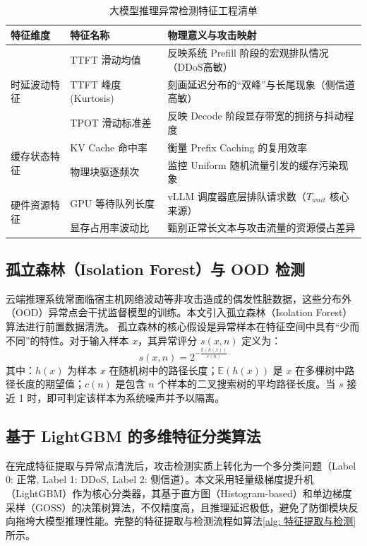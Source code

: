 \documentclass[master, vlined]{DissertUESTC}
\begin{document}
	\begin{table}[!ht]
		\caption{大模型推理异常检测特征工程清单} \label{tab: 大模型推理异常检测特征工程清单}
		\begin{tabular}{p{2.5cm} p{3.5cm} p{8cm}}
			\toprule
			\textbf{特征维度} & \textbf{特征名称} & \textbf{物理意义与攻击映射} \\
			\midrule
			\multirow{3}{*}{时延波动特征} & TTFT 滑动均值 & 反映系统 Prefill 阶段的宏观排队情况（DDoS高敏） \\
			& TTFT 峰度 (Kurtosis) & 刻画延迟分布的“双峰”与长尾现象（侧信道高敏） \\
			& TPOT 滑动标准差 & 反映 Decode 阶段显存带宽的拥挤与抖动程度 \\
			\midrule
			\multirow{2}{*}{缓存状态特征} & KV Cache 命中率 & 衡量 Prefix Caching 的复用效率 \\
			& 物理块驱逐频次 & 监控 Uniform 随机流量引发的缓存污染现象 \\
			\midrule
			\multirow{2}{*}{硬件资源特征} & GPU 等待队列长度 & vLLM 调度器底层排队请求数（$T_{wait}$ 核心来源） \\
			& 显存占用率波动比 & 甄别正常长文本与攻击流量的资源侵占差异 \\
			\bottomrule
		\end{tabular}
	\end{table}

	\subsection{孤立森林（Isolation Forest）与 OOD 检测}
	云端推理系统常面临宿主机网络波动等非攻击造成的偶发性脏数据，这些分布外（OOD）异常点会干扰监督模型的训练。本文引入孤立森林（Isolation Forest）算法进行前置数据清洗。
	孤立森林的核心假设是异常样本在特征空间中具有“少而不同”的特性。对于输入样本 $x$，其异常评分 $s(x, n)$ 定义为：
	\begin{equation}
		s(x, n) = 2^{-\frac{\mathbb{E}(h(x))}{c(n)}}
	\end{equation}
	其中：$h(x)$ 为样本 $x$ 在随机树中的路径长度；$\mathbb{E}(h(x))$ 是 $x$ 在多棵树中路径长度的期望值；$c(n)$ 是包含 $n$ 个样本的二叉搜索树的平均路径长度。当 $s$ 接近 1 时，即可判定该样本为系统噪声并予以隔离。

	\subsection{基于 LightGBM 的多维特征分类算法}
	在完成特征提取与异常点清洗后，攻击检测实质上转化为一个多分类问题（Label 0: 正常, Label 1: DDoS, Label 2: 侧信道）。本文采用轻量级梯度提升机（LightGBM）作为核心分类器，其基于直方图（Histogram-based）和单边梯度采样（GOSS）的决策树算法，不仅精度高，且推理延迟极低，避免了防御模块反向拖垮大模型推理性能。完整的特征提取与检测流程如算法\ref{alg: 特征提取与检测}所示。
\end{document}
